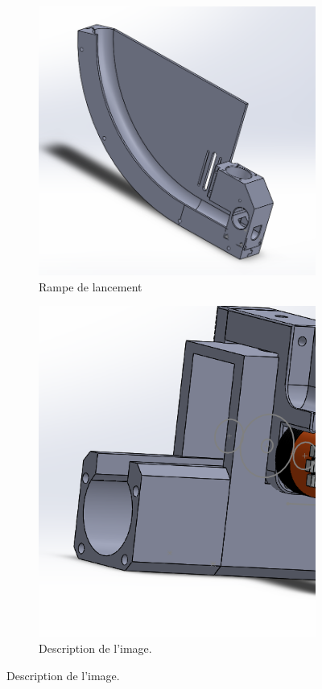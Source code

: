 \begin{figure}[h!]
    \centering

    \begin{subfigure}{0.3\linewidth}
        \centering
        \includegraphics[width=\linewidth]{img/s2/cad/rampe}
        \caption{Rampe de lancement}
        \label{fig:s2-cad-rampe}
    \end{subfigure}
    \begin{subfigure}{0.3\linewidth}
        \centering
        \includegraphics[width=\linewidth]{img/s2/cad/cannon}
        \caption{Description de l'image.}
        \label{fig:s2-cad-cannon}
    \end{subfigure}
    

\end{figure}
